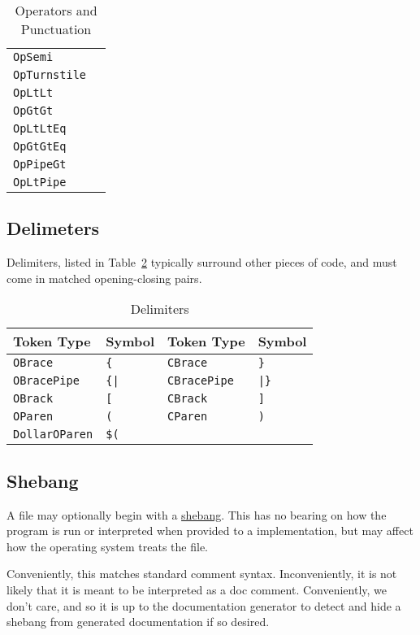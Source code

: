\begin{table}[h]
{\begin{tabular}[t]{ll}
        \texttt{OpSemi} & \op{;} \\
        \texttt{OpTurnstile} & \op{<-} \\
        \hline
        \texttt{OpLtLt} & \op{<<} \\
        \texttt{OpGtGt} & \op{>>} \\
        \texttt{OpLtLtEq} & \op{<<=} \\
        \texttt{OpGtGtEq} & \op{>>=} \\
        \texttt{OpPipeGt} & \op{|>} \\
        \texttt{OpLtPipe} & \op{<|} \\
        \hline
    \end{tabular}
}
\caption{\label{tab:operators}Operators and Punctuation}
\end{table}

\subsection{Delimeters}

Delimiters, listed in Table~\ref{tab:delimiters} typically surround other
pieces of code, and must come in matched opening-closing pairs.

\begin{table}[h]
    \centering
    \begin{tabular}[t]{llll}
        \hline
        \textbf{Token Type} & \textbf{Symbol}& \textbf{Token Type} & \textbf{Symbol} \\
        \hline
        \texttt{OBrace} & \texttt{\{}& \texttt{CBrace} & \texttt{\}} \\
        \texttt{OBracePipe} & \texttt{\{|}& \texttt{CBracePipe} & \texttt{|\}} \\
        \texttt{OBrack} & \texttt{[} & \texttt{CBrack} & \texttt{]} \\
        \texttt{OParen} & \texttt{(} & \texttt{CParen} & \texttt{)} \\
        \texttt{DollarOParen} & \texttt{\$(} & & \\ %
        \hline
    \end{tabular}
    \caption{\label{tab:delimiters}Delimiters}
\end{table}

\subsection{Shebang}

A \Trilogy{} file may optionally begin with a
\href{https://en.wikipedia.org/wiki/Shebang_(Unix)}{shebang}. This has no bearing
on how the program is run or interpreted when provided to a \Trilogy{} implementation,
but may affect how the operating system treats the file.

Conveniently, this matches standard comment syntax. Inconveniently, it is not
likely that it is meant to be interpreted as a doc comment. Conveniently,
we don't care, and so it is up to the documentation generator to detect and
hide a shebang from generated documentation if so desired.

\FloatBarrier
